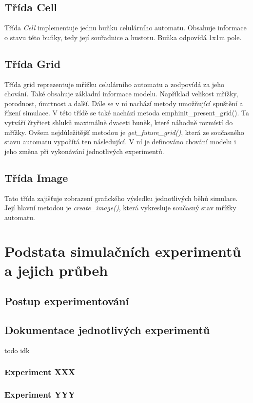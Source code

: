 \documentclass[a4paper,11pt]{article}
\begin{document}
\subsection{Třída Cell}
Třída \emph{Cell} implementuje jednu buňku celulárního automatu. Obsahuje informace o stavu této buňky, tedy její souřadnice a hustotu. Buňka odpovídá 1x1m pole.

\subsection{Třída Grid}
Třída grid reprezentuje mřížku celulárního automatu a zodpovídá za jeho chování. Také obsahuje základní informace modelu. Například velikost mřížky, porodnost, úmrtnost a další. Dále se v ní nachází metody umožňující spuštění a řízení simulace. V této třídě se také nachází metoda emph{init\_present\_grid()}. Ta vytváří čtyřicet shluků maximálně dvaceti buněk, které náhodně rozmístí do mřížky.
Ovšem nejdůležitější metodou je \emph{get\_future\_grid()}, která ze současného stavu automatu vypočítá ten následující. V ní je definováno chování modelu i jeho změna při vykonávání jednotlivých experimentů.

\subsection{Třída Image}
Tato třída zajišťuje zobrazení grafického výsledku jednotlivých běhů simulace. Její hlavní metodou je \emph{create\_image()}, která vykresluje současný stav mřížky automatu.


\section{Podstata simulačních experimentů a jejich průbeh}
\subsection{Postup experimentování}
\subsection{Dokumentace jednotlivých experimentů}
todo idk
\subsubsection{Experiment XXX}
\subsubsection{Experiment YYY}
\end{document}
